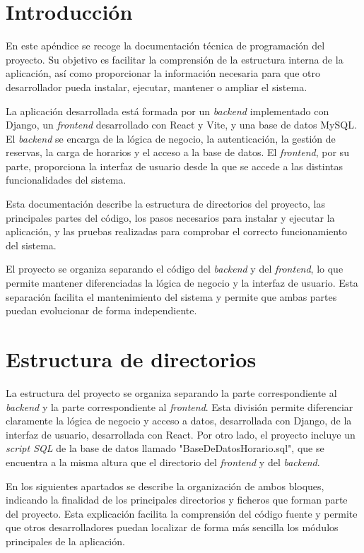 
\section{Introducción}

En este apéndice se recoge la documentación técnica de programación del proyecto. Su objetivo es facilitar la comprensión de la estructura interna de la aplicación, así como proporcionar la información necesaria para que otro desarrollador pueda instalar, ejecutar, mantener o ampliar el sistema.

La aplicación desarrollada está formada por un \textit{backend} implementado con Django, un \textit{frontend} desarrollado con React y Vite, y una base de datos MySQL. El \textit{backend} se encarga de la lógica de negocio, la autenticación, la gestión de reservas, la carga de horarios y el acceso a la base de datos. El \textit{frontend}, por su parte, proporciona la interfaz de usuario desde la que se accede a las distintas funcionalidades del sistema.

Esta documentación describe la estructura de directorios del proyecto, las principales partes del código, los pasos necesarios para instalar y ejecutar la aplicación, y las pruebas realizadas para comprobar el correcto funcionamiento del sistema.

El proyecto se organiza separando el código del \textit{backend} y del \textit{frontend}, lo que permite mantener diferenciadas la lógica de negocio y la interfaz de usuario. Esta separación facilita el mantenimiento del sistema y permite que ambas partes puedan evolucionar de forma independiente.

\section{Estructura de directorios}

La estructura del proyecto se organiza separando la parte correspondiente al \textit{backend} y la parte correspondiente al \textit{frontend}. Esta división permite diferenciar claramente la lógica de negocio y acceso a datos, desarrollada con Django, de la interfaz de usuario, desarrollada con React. Por otro lado, el proyecto incluye un \textit{script SQL} de la base de datos llamado "BaseDeDatosHorario.sql", que se encuentra a la misma altura que el directorio del \textit{frontend} y del \textit{backend}.

En los siguientes apartados se describe la organización de ambos bloques, indicando la finalidad de los principales directorios y ficheros que forman parte del proyecto. Esta explicación facilita la comprensión del código fuente y permite que otros desarrolladores puedan localizar de forma más sencilla los módulos principales de la aplicación.


